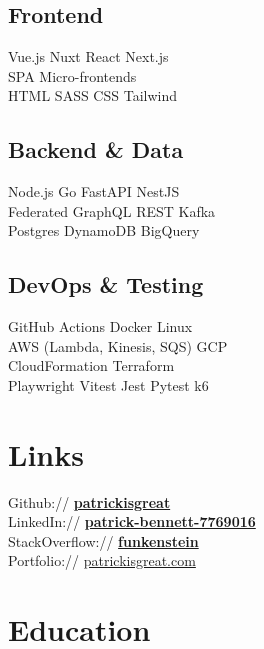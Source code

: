 \documentclass[]{pb-resume}
\begin{document}
\begin{minipage}[t]{0.33\textwidth}
\subsection{Frontend}
Vue.js \textbullet{} Nuxt \textbullet{} React \textbullet{} Next.js \\
SPA \textbullet{} Micro-frontends \\
HTML \textbullet{} SASS \textbullet{} CSS \textbullet{} Tailwind
\sectionsep

\subsection{Backend \& Data}
Node.js \textbullet{} Go \textbullet{} FastAPI \textbullet{} NestJS \\
Federated GraphQL \textbullet{} REST \textbullet{} Kafka \\
Postgres \textbullet{} DynamoDB \textbullet{} BigQuery
\sectionsep

\subsection{DevOps \& Testing}
GitHub Actions \textbullet{} Docker \textbullet{} Linux \\
AWS (Lambda, Kinesis, SQS) \textbullet{} GCP \\
CloudFormation \textbullet{} Terraform \\
Playwright \textbullet{} Vitest \textbullet{} Jest \textbullet{} Pytest \textbullet{} k6
\sectionsep


\section{Links}
Github:// \href{https://github.com/patrickisgreat}{\bf patrickisgreat} \\
LinkedIn://  \href{https://www.linkedin.com/in/patrick-bennett-7769016}{\bf patrick-bennett-7769016} \\
StackOverflow:// \href{https://stackoverflow.com/users/864159/funkenstein}{\bf funkenstein} \\
Portfolio:// \href{https://patrickisgreat.com/}{patrickisgreat.com}
\sectionsep


\section{Education}


\end{minipage}
\end{document}
